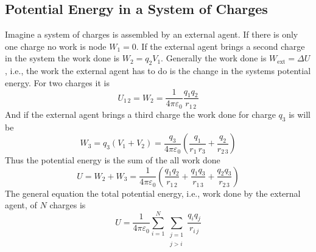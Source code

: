 \subsection{Potential Energy in a System of Charges}
Imagine a system of charges is assembled by an external agent. If there is only one charge no work is node $W_1=0$. If the external agent brings a second charge in the system the work done is $W_2=q_2V_1$. Generally the work done is $W_{\text{ext}}=\Delta U$, i.e., the work the external agent has to do is the change in the systems potential energy. For two charges it is
\begin{equation*}
  U_{1\,2} = W_2 = \frac{1}{4\pi\varepsilon_0}\frac{q_1q_2}{r_{1\,2}}
\end{equation*}
And if the external agent brings a third charge the work done for charge $q_3$ is will be
\begin{equation*}
  W_3 = q_3(V_1+V_2)=\frac{q_3}{4\pi\varepsilon_0}\left(\frac{q_1}{r_1\,r_3}+\frac{q_2}{r_{2\,3}}\right)
\end{equation*}
Thus the potential energy is the sum of the all work done
\begin{equation*}
  U = W_2 + W_3 = \frac{1}{4\pi\varepsilon_0}\left(\frac{q_1q_2}{r_{1\,2}}+\frac{q_1q_3}{r_{1\,3}}+\frac{q_2q_3}{r_{2\,3}}\right)
\end{equation*}
The general equation the total potential energy, i.e., work done by the external agent, of $N$ charges is
\begin{equation*}
  U = \frac{1}{4\pi\varepsilon_0} \sum_{i=1}^N\sum_{\substack{j=1 \\ j > i}}\frac{q_iq_j}{r_{i\,j}}
\end{equation*}


